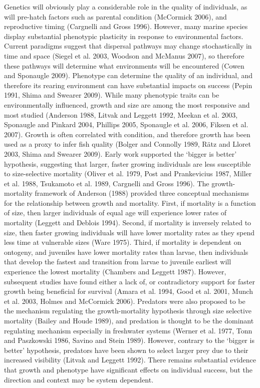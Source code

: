 \documentclass[]{book}
\begin{document}
Genetics will obviously play a considerable role in the quality of
individuals, as will pre-hatch factors such as parental condition
(McCormick 2006), and reproductive timing (Cargnelli and Gross 1996).
However, many marine species display substantial phenotypic plasticity
in response to environmental factors. Current paradigms suggest that
dispersal pathways may change stochastically in time and space (Siegel
et al. 2003, Woodson and McManus 2007), so therefore these pathways will
determine what environments will be encountered (Cowen and Sponaugle
2009). Phenotype can determine the quality of an individual, and
therefore its rearing environment can have substantial impacts on
success (Pepin 1991, Shima and Swearer 2009). While many phenotypic
traits can be environmentally influenced, growth and size are among the
most responsive and most studied (Anderson 1988, Litvak and Leggett
1992, Meekan et al. 2003, Sponaugle and Pinkard 2004, Phillips 2005,
Sponaugle et al. 2006, Fiksen et al. 2007). Growth is often correlated
with condition, and therefore growth has been used as a proxy to infer
fish quality (Bolger and Connolly 1989, Rätz and Lloret 2003, Shima and
Swearer 2009). Early work supported the `bigger is better' hypothesis,
suggesting that larger, faster growing individuals are less susceptible
to size-selective mortality (Oliver et al. 1979, Post and Prankevicius
1987, Miller et al. 1988, Tsukamoto et al. 1989, Cargnelli and Gross
1996). The growth-mortality framework of Anderson (1988) provided three
conceptual mechanisms for the relationship between growth and mortality.
First, if mortality is a function of size, then larger individuals of
equal age will experience lower rates of mortality (Leggett and Deblois
1994). Second, if mortality is inversely related to size, then faster
growing individuals will have lower mortality rates as they spend less
time at vulnerable sizes (Ware 1975). Third, if mortality is dependent
on ontogeny, and juveniles have lower mortality rates than larvae, then
individuals that develop the fastest and transition from larvae to
juvenile earliest will experience the lowest mortality (Chambers and
Leggett 1987). However, subsequent studies have found either a lack of,
or contradictory support for faster growth being beneficial for survival
(Amara et al. 1994, Good et al. 2001, Munch et al. 2003, Holmes and
McCormick 2006). Predators were also proposed to be the mechanism
regulating the growth-mortality hypothesis through size selective
mortality (Bailey and Houde 1989), and predation is thought to be the
dominant regulating mechanism especially in freshwater systems (Werner
et al. 1977, Tonn and Paszkowski 1986, Savino and Stein 1989). However,
contrary to the `bigger is better' hypothesis, predators have been shown
to select larger prey due to their increased visibility (Litvak and
Leggett 1992). There remains substantial evidence that growth and
phenotype have significant effects on individual success, but the
direction and context may be system dependent.
\end{document}
